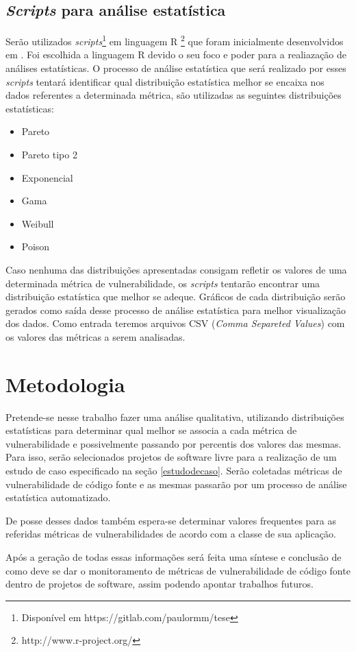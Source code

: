 \subsection{\textit{Scripts} para análise estatística}

Serão utilizados \textit{scripts}\footnote{Disponível em https://gitlab.com/paulormm/tese} em linguagem R
\footnote{http://www.r-project.org/} que foram inicialmente desenvolvidos em \cite{meirelles2013}. Foi escolhida a linguagem R
devido o seu foco e poder para a realiazação de análises estatísticas. O processo de análise estatística que será realizado
por esses \textit{scripts} tentará identificar qual distribuição estatística melhor se encaixa nos dados referentes a 
determinada métrica, são utilizadas as seguintes distribuições estatísticas:

\begin{itemize}
  \item Pareto
  \item Pareto tipo 2
  \item Exponencial
  \item Gama
  \item Weibull
  \item Poison
\end{itemize}

Caso nenhuma das distribuições apresentadas consigam refletir os valores de uma determinada métrica de vulnerabilidade, os
\textit{scripts} tentarão encontrar uma distribuição estatística que melhor se adeque. Gráficos de cada distribuição serão
gerados como saída desse processo de análise estatística para melhor visualização dos dados. Como entrada teremos arquivos
CSV (\textit{Comma Separeted Values}) com os valores das métricas a serem analisadas.

\section{Metodologia}

Pretende-se nesse trabalho fazer uma análise qualitativa, utilizando distribuições estatísticas para determinar qual melhor
se associa a cada métrica de vulnerabilidade e possivelmente passando por percentis dos valores das mesmas. Para isso, serão
selecionados projetos de software livre para a realização de um estudo de caso especificado na seção \ref{estudodecaso}.
Serão coletadas métricas de vulnerabilidade de código fonte e as mesmas passarão por um processo de análise estatística
automatizado. 

De posse desses dados também espera-se determinar valores frequentes para as referidas métricas de vulnerabilidades de acordo
com a classe de sua aplicação.

Após a geração de todas essas informações será feita uma síntese e conclusão de como deve se dar o monitoramento de métricas de 
vulnerabilidade de código fonte dentro de projetos de software, assim podendo apontar trabalhos futuros.

